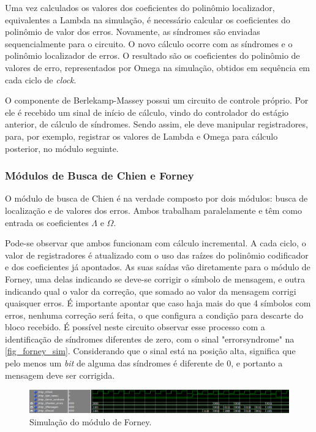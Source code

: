 	Uma vez calculados os valores dos coeficientes do polinômio localizador, equivalentes a Lambda na simulação, é necessário calcular os coeficientes do polinômio de valor dos erros. Novamente, as síndromes são enviadas sequencialmente para o circuito. O novo cálculo ocorre com as síndromes e o polinômio localizador de erros. O resultado são os coeficientes do polinômio de valores de erro, representados por Omega na simulação, obtidos em sequência em cada ciclo de \textit{clock}. 
	
	O componente de Berlekamp-Massey possui um circuito de controle próprio. Por ele é recebido um sinal de início de cálculo, vindo do controlador do estágio anterior, de cálculo de síndromes. Sendo assim, ele deve manipular registradores, para, por exemplo, registrar os valores de Lambda e Omega para cálculo posterior, no módulo seguinte.
	
	\subsubsection{Módulos de Busca de Chien e Forney}
	
	O módulo de busca de Chien é na verdade composto por dois módulos: busca de localização e de valores dos erros. Ambos trabalham paralelamente e têm como entrada os coeficientes $\Lambda$ e $\Omega$. 
	
	Pode-se observar que ambos funcionam com cálculo incremental. A cada ciclo, o valor de registradores é atualizado com o uso das raízes do polinômio codificador e dos coeficientes já apontados. As suas saídas vão diretamente para o módulo de Forney, uma delas indicando se deve-se corrigir o símbolo de mensagem, e outra indicando qual o valor da correção, que somado ao valor da mensagem corrigi quaisquer erros. É importante apontar que caso haja mais do que 4 símbolos com erros, nenhuma correção será feita, o que configura a condição para descarte do bloco recebido. É possível neste circuito observar esse processo com a identificação de síndromes diferentes de zero, com o sinal "errorsyndrome" na \autoref{fig_forney_sim}. Considerando que o sinal está na posição alta, significa que pelo menos um \textit{bit} de alguma das síndromes é diferente de 0, e portanto a mensagem deve ser corrigida. 
	
	\begin{figure}[!htb]
		\caption{\label{fig_forney_sim}Simulação do módulo de Forney.}
		\centering
		\includegraphics[width=1\textwidth]{RS/Sim_forney.PNG}
	\end{figure}
	
